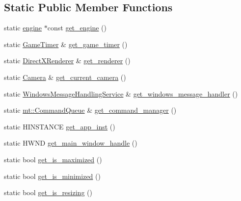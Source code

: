 \subsection*{Static Public Member Functions}
\begin{DoxyCompactItemize}
\item 
static \hyperlink{classengine}{engine} $\ast$const \hyperlink{classengine_a240cde5717390f5f154bc9e4af2c36eb_a240cde5717390f5f154bc9e4af2c36eb}{get\+\_\+engine} ()
\item 
static \hyperlink{class_game_timer}{Game\+Timer} \& \hyperlink{classengine_ac0dc17b9397ed8545aec886720e42215_ac0dc17b9397ed8545aec886720e42215}{get\+\_\+game\+\_\+timer} ()
\item 
static \hyperlink{class_direct_x_renderer}{Direct\+X\+Renderer} \& \hyperlink{classengine_a06cd2ddd20745b1c8ef79e7a861bb6bd_a06cd2ddd20745b1c8ef79e7a861bb6bd}{get\+\_\+renderer} ()
\item 
static \hyperlink{class_camera}{Camera} \& \hyperlink{classengine_a54e5e763df5801c9289a2030635b3d52_a54e5e763df5801c9289a2030635b3d52}{get\+\_\+current\+\_\+camera} ()
\item 
static \hyperlink{class_windows_message_handling_service}{Windows\+Message\+Handling\+Service} \& \hyperlink{classengine_a1c22e1de5498965992bc25cfba715c99_a1c22e1de5498965992bc25cfba715c99}{get\+\_\+windows\+\_\+message\+\_\+handler} ()
\item 
static \hyperlink{classmt_1_1_command_queue}{mt\+::\+Command\+Queue} \& \hyperlink{classengine_a3351563741589b6f8f05a53bbbe544a7_a3351563741589b6f8f05a53bbbe544a7}{get\+\_\+command\+\_\+manager} ()
\item 
static H\+I\+N\+S\+T\+A\+N\+CE \hyperlink{classengine_aa0d5e48083116ded90d019bffcfa2d39_aa0d5e48083116ded90d019bffcfa2d39}{get\+\_\+app\+\_\+inst} ()
\item 
static H\+W\+ND \hyperlink{classengine_a7fa93c3ca0e4346f17ff90410e3377ea_a7fa93c3ca0e4346f17ff90410e3377ea}{get\+\_\+main\+\_\+window\+\_\+handle} ()
\item 
static bool \hyperlink{classengine_a84cfa36c736c00778ca2a51b13bd96d9_a84cfa36c736c00778ca2a51b13bd96d9}{get\+\_\+is\+\_\+maximized} ()
\item 
static bool \hyperlink{classengine_ad361c7acfc6f8e41646610bcc2bbbc5c_ad361c7acfc6f8e41646610bcc2bbbc5c}{get\+\_\+is\+\_\+minimized} ()
\item 
static bool \hyperlink{classengine_a8afc7b29034df66b7dd991dff06c0118_a8afc7b29034df66b7dd991dff06c0118}{get\+\_\+is\+\_\+resizing} ()

\end{DoxyCompactItemize}
